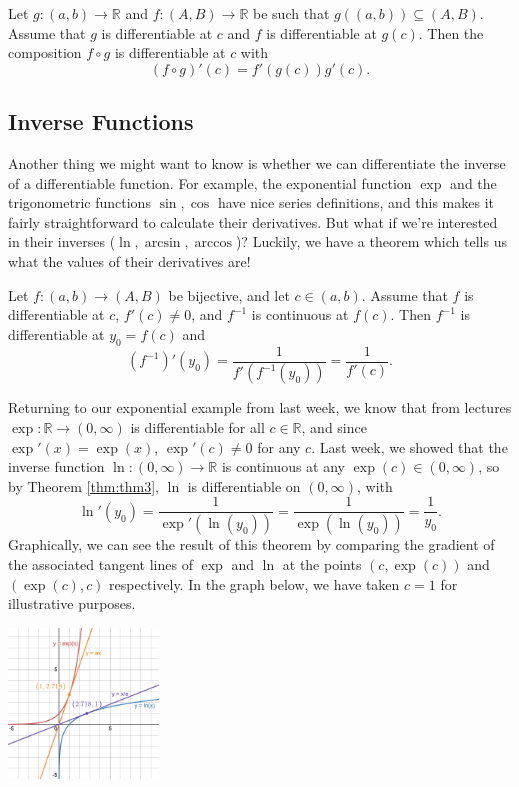 \documentclass[
  12pt,
  a4paper]{extarticle}
\theoremstyle{plain}
\theoremstyle{definition}
\theoremstyle{plain}
\theoremstyle{plain}
\theoremstyle{plain}
\theoremstyle{plain}
\theoremstyle{definition}
\theoremstyle{definition}
\theoremstyle{remark}
\theoremstyle{remark}
\let\BeginKnitrBlock\begin \let\EndKnitrBlock\end
\renewcommand{\;}{\,}
\begin{document}
\BeginKnitrBlock{theorem}[Chain Rule]
{\label{thm:thm2} }Let \(g:(a,b) \to \mathbb{R}\) and \(f:(A,B) \to \mathbb{R}\) be such that \(g\left((a,b)\right) \subseteq (A,B).\) Assume that \(g\) is differentiable at \(c\) and \(f\) is differentiable at \(g(c)\). Then the composition \(f\circ g\) is differentiable at \(c\) with \[\left(f\circ g\right)'(c) = f'\left(g(c)\right)g'(c).\]
\EndKnitrBlock{theorem}

\hypertarget{inverse-functions}{%
\subsection{Inverse Functions}\label{inverse-functions}}

Another thing we might want to know is whether we can differentiate the inverse of a differentiable function. For example, the exponential function \(\exp\) and the trigonometric functions \(\sin, \cos\) have nice series definitions, and this makes it fairly straightforward to calculate their derivatives. But what if we're interested in their inverses (\(\ln, \arcsin, \arccos\))? Luckily, we have a theorem which tells us what the values of their derivatives are!

\BeginKnitrBlock{theorem}[Inverse Function Theorem]
{\label{thm:thm3} }Let \(f: (a,b) \to (A, B)\) be bijective, and let \(c \in (a,b).\) Assume that \(f\) is differentiable at \(c\), \(f'(c) \neq 0\), and \(f^{-1}\) is continuous at \(f(c).\) Then \(f^{-1}\) is differentiable at \(y_0 = f(c)\) and \[\left(f^{-1}\right)'(y_0) = \frac{1}{f'\left(f^{-1}(y_0)\right)} = \frac{1}{f'(c)}.\]
\EndKnitrBlock{theorem}

\BeginKnitrBlock{example}
{\label{exm:ex1} }Returning to our exponential example from last week, we know that from lectures \(\exp: \mathbb{R} \to (0,\infty)\) is differentiable for all \(c \in \mathbb{R}\), and since \(\exp'(x) = \exp(x)\), \(\exp'(c) \neq 0\) for any \(c\). Last week, we showed that the inverse function \(\ln: (0,\infty) \to \mathbb{R}\) is continuous at any \(\exp(c) \in (0,\infty)\), so by Theorem \ref{thm:thm3}, \(\ln\) is differentiable on \((0,\infty)\), with \[\ln'(y_0) = \frac{1}{\exp'(\ln(y_0))} = \frac{1}{\exp(\ln(y_0))} = \frac{1}{y_0}.\] Graphically, we can see the result of this theorem by comparing the gradient of the associated tangent lines of \(\exp\) and \(\ln\) at the points \((c,\exp(c))\) and \((\exp(c),c)\) respectively. In the graph below, we have taken \(c = 1\) for illustrative purposes.

\includegraphics[width=0.3\textwidth,height=\textheight]{./explog2.png}
\EndKnitrBlock{example}
\end{document}
